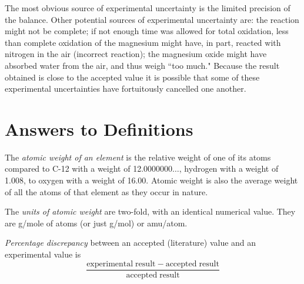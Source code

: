 \documentclass{article}
\begin{document}
The most obvious source of experimental uncertainty is the limited precision of the balance. Other potential sources of experimental uncertainty are: the reaction might not be complete; if not enough time was allowed for total oxidation, less than complete oxidation of the magnesium might have, in part, reacted with nitrogen in the air (incorrect reaction); the magnesium oxide might have absorbed water from the air, and thus weigh ``too much." Because the result obtained is close to the accepted value it is possible that some of these experimental uncertainties have fortuitously cancelled one another.


\section{Answers to Definitions}

\begin{enumerate}
\begin{item}
The \emph{atomic weight of an element} is the relative weight of one of its atoms compared to C-12 with a weight of 12.0000000$\ldots$, hydrogen with a weight of 1.008, to oxygen with a weight of 16.00. Atomic weight is also the average weight of all the atoms of that element as they occur in nature.
\end{item}
\begin{item}
The \emph{units of atomic weight} are two-fold, with an identical numerical value. They are g/mole of atoms (or just g/mol) or amu/atom.
\end{item}
\begin{item}
\emph{Percentage discrepancy} between an accepted (literature) value and an experimental value is
\begin{equation*}
\frac{\mathrm{experimental\;result} - \mathrm{accepted\;result}}{\mathrm{accepted\;result}}
\end{equation*}
\end{item}
\end{enumerate}






\end{document}
